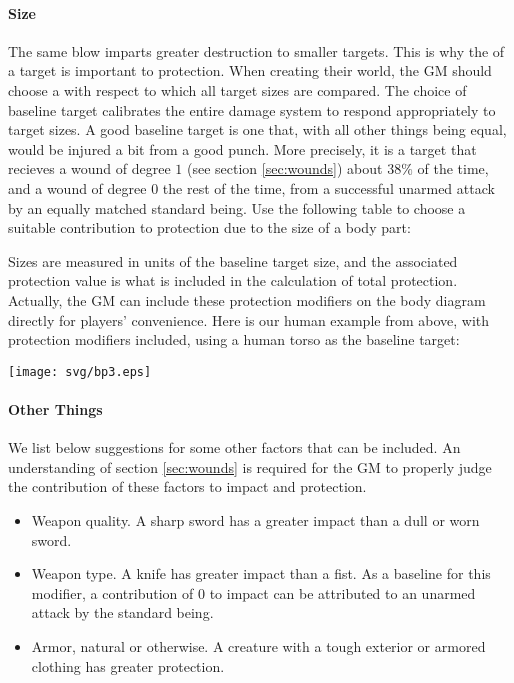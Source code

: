 \paragraph{Size}
The same blow imparts greater destruction to smaller targets. 
This is why the  of a target is important to protection.
When creating their world, the GM should choose a 
with respect to which all target sizes are compared.
The choice of baseline target calibrates the entire damage system to respond appropriately to target sizes.
A good baseline target is one that, with all other things being equal, would be injured a bit from a good punch.
More precisely, it is a target that recieves a wound of degree $1$ (see section \ref{sec:wounds}) about $38\%$
of the time, and a wound of degree $0$ the rest of the time, from a successful unarmed attack by an equally matched standard being.
Use the following table to choose a suitable contribution to protection due to the size of a body part:
\begin{center}

\end{center}
Sizes are measured in units of the baseline target size,
and the associated protection value is what is included in the calculation of total protection.
Actually, the GM can include these protection modifiers
on the body diagram
directly for players' convenience.
Here is our human example from above, with protection modifiers included,
using a human torso as the baseline target:

\begin{center} \texttt{[image: svg/bp3.eps]} \end{center}

\paragraph{Other Things}
We list below suggestions for some other factors that can be included.
An understanding of section \ref{sec:wounds} is required for the GM to properly
judge the contribution of these factors to impact and protection.
\vspace{-1em}\begin{itemize}
\item Weapon quality. A sharp sword has a greater impact than a dull or worn sword.
\item Weapon type. A knife has greater impact than a fist.
As a baseline for this modifier, a contribution of $0$ to impact
can be attributed to an unarmed attack by the standard being.
\item Armor, natural or otherwise. A creature with a tough exterior or armored clothing has greater protection.
\end{itemize}


